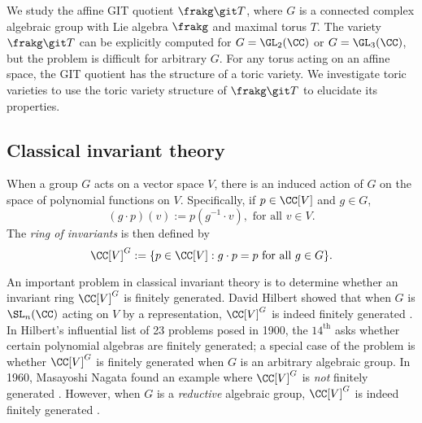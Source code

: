 We study the affine GIT quotient $\frakg \git T$, where $G$ is a connected complex algebraic group with Lie algebra $\frakg$ and maximal torus $T$.
The variety $\frakg \git T$ can be explicitly computed for $G = \GL_2(\CC)$ or $G = \GL_3(\CC)$, but the problem is difficult for arbitrary $G$.
For any torus acting on an affine space, the GIT quotient has the structure of a toric variety.
We investigate toric varieties to use the toric variety structure of $\frakg \git T$ to elucidate its properties.


\subsection{Classical invariant theory}
When a group $G$ acts on a vector space $V$, there is an induced action of $G$ on the space of polynomial functions on $V$.
Specifically, if $p \in \CC[V]$ and $g \in G$,
$$(g \cdot p)(v) := p(g^{-1} \cdot v), \text{ for all } v \in V.$$
The \emph{ring of invariants} is then defined by
$$\CC[V]^G := \{p \in \CC[V] : g \cdot p = p \text{ for all } g \in G\}.$$

An important problem in classical invariant theory is to determine whether an invariant ring $\CC[V]^G$ is finitely generated.
David Hilbert showed that when $G$ is $\SL_n(\CC)$ acting on $V$ by a representation, $\CC[V]^G$ is indeed finitely generated \cite{Hilbert90}.
In Hilbert's influential list of 23 problems posed in 1900, the $14^\text{th}$ asks whether certain polynomial algebras are finitely generated;
a special case of the problem is whether $\CC[V]^G$ is finitely generated when $G$ is an arbitrary algebraic group.
In 1960, Masayoshi Nagata found an example where $\CC[V]^G$ is \emph{not} finitely generated \cite{Nagata60}.
However, when $G$ is a \emph{reductive} algebraic group, $\CC[V]^G$ is indeed finitely generated \cite[Theorem 4.51]{Mukai03}.


